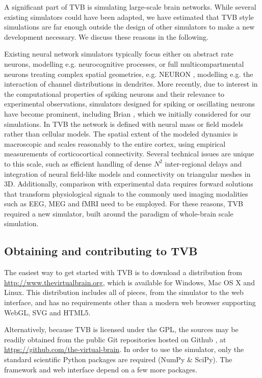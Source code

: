A significant part of TVB is simulating large-scale brain networks. While
several existing simulators could have been adapted, we have estimated that
TVB style simulations are far enough outside the design of other simulators to
make a new development necessary. We discuss these reasons in the following. 

Existing neural network simulators typically focus either on abstract rate neurons, 
modelling e.g. neurocognitive processes, or 
full multicompartmental neurons treating complex spatial
geometries, e.g. NEURON \citep{Hines_2001}, modelling e.g. the interaction of 
channel distributions in dendrites.  More recently, due to interest in
the computational properties of spiking neurons and their relevance to
experimental observations, simulators designed for spiking or oscillating neurons
have become prominent, including Brian \citep{Goodman_2009}, which we initially 
considered for our simulations.
In TVB the network is defined with neural mass or field
models \citep{Deco_2008a, Coombes_2010} rather than cellular models. The
spatial extent of the modeled dynamics is macroscopic and scales reasonably 
to the entire cortex, using empirical measurements of corticocortical
connectivity. Several technical issues are unique to this scale, such
as efficient handling of dense $N^2$ inter-regional delays and integration
of neural field-like models and connectivity on triangular meshes in 3D.
Additionally, comparison with experimental data requires forward solutions
that transform physiological signals to the commonly
used imaging modalities such as EEG, MEG and fMRI need to be employed.
For these reasons, TVB required a new simulator, built around the paradigm
of whole-brain scale simulation.

\subsection{Obtaining and contributing to TVB}

The easiest way to get started with TVB is to download a distribution
from \url{http://www.thevirtualbrain.org}, which is available for Windows,
Mac OS X and Linux. This distribution includes
all of pieces, from the simulator to the web interface, and has no
requirements other than a modern web browser supporting WebGL, SVG and
HTML5.

Alternatively, because TVB is licensed under the GPL, the sources may be
readily obtained from the public Git repositories hosted on Github
\citep{dabbish2012social}, at 
\url{https://github.com/the-virtual-brain}. In order to use the simulator, 
only the standard scientific Python packages are required (NumPy \& SciPy).
The framework and web interface depend on a few more packages. 

